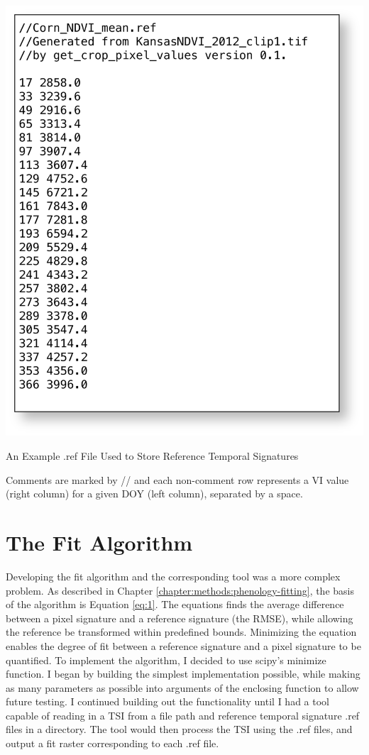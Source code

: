 \begin{ssfigure}
  \centering
  \includegraphics[scale=0.75]{Graphics/reffile.png}
  \caption{An Example .ref File Used to Store Reference Temporal Signatures}
  \medskip
  \small
  Comments are marked by // and each non-comment row represents a VI value (right column) for a given DOY (left column), separated by a space.
  \label{fig:reffile}
\end{ssfigure}



\section{The Fit Algorithm}
\label{appendix:tools:fit}

Developing the fit algorithm and the corresponding tool was a more complex problem. As described in Chapter \ref{chapter:methods:phenology-fitting}, the basis of the algorithm is Equation \ref{eq:1}. The equations finds the average difference between a pixel signature and a reference signature (the RMSE), while allowing the reference be transformed within predefined bounds. Minimizing the equation enables the degree of fit between a reference signature and a pixel signature to be quantified. To implement the algorithm, I decided to use scipy’s minimize function. I began by building the simplest implementation possible, while making as many parameters as possible into arguments of the enclosing function to allow future testing. I continued building out the functionality until I had a tool capable of reading in a TSI from a file path and reference temporal signature .ref files in a directory. The tool would then process the TSI using the .ref files, and output a fit raster corresponding to each .ref file.

